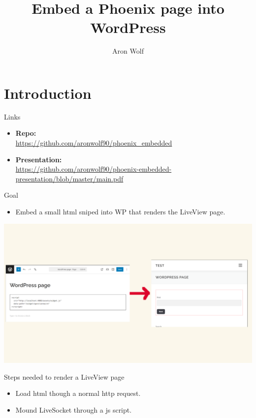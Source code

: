 \documentclass{beamer}
\title[Short Title]{Embed a Phoenix page into WordPress}
\author{Aron Wolf}
\date{}
\begin{document}
\begin{frame}
  \titlepage
\end{frame}

\section{Introduction}

\begin{frame}{Links}
  \begin{itemize}
    \item \textbf{Repo:}
      \\
      \url{https://github.com/aronwolf90/phoenix_embedded}
      \\
      \qquad
    \item \textbf{Presentation:}
      \\
      \url{https://github.com/aronwolf90/phoenix-embedded-presentation/blob/master/main.pdf}
      \\
      \qquad
  \end{itemize}
\end{frame}

\begin{frame}{Goal}
  \begin{itemize}
    \item Embed a small html sniped into WP that renders the LiveView page.
  \end{itemize}
  \centering
  \includegraphics[width=1\linewidth]{images/goal.png}
\end{frame}

\begin{frame}{Steps needed to render a LiveView page}
  \begin{itemize}
    \item Load html though a normal http request.
    \item Mound LiveSocket through a js script.
  \end{itemize}
\end{frame}
\end{document}
